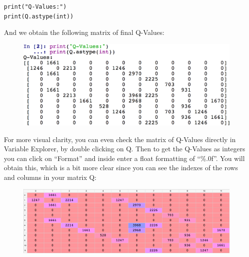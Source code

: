 \documentclass[]{book}
\begin{document}
\begin{lstlisting}
print("Q-Values:")
print(Q.astype(int))
\end{lstlisting}

And we obtain the following matrix of final Q-Values:

\begin{figure}[!htbp]
        \begin{center}
            \includegraphics[scale=0.5]{Q_Values_Console.png}
        \end{center}
\end{figure}

For more visual clarity, you can even check the matrix of Q-Values directly in Variable Explorer, by double clicking on Q. Then to get the Q-Values as integers you can click on ``Format'' and inside enter a float formatting of ``\%.0f''. You will obtain this, which is a bit more clear since you can see the indexes of the rows and columns in your matrix Q:

\begin{figure}[!htbp]
        \begin{center}
            \includegraphics[scale=0.35]{Q_Values_Variable_Explorer.png}
        \end{center}
\end{figure}
\end{document}
